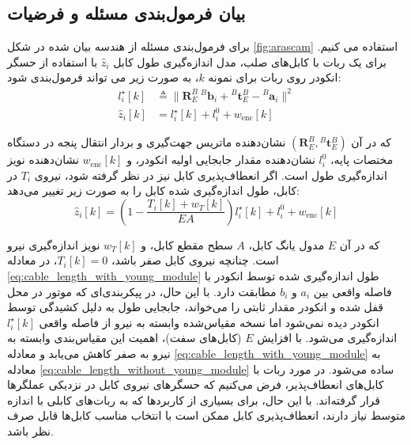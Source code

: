 \subsection{بیان فرمول‌بندی مسئله و فرضیات} \label{seq:formulation_rigid}
برای فرمول‌بندی مسئله از هندسه بیان شده در شکل 
\ref{fig:arascam}
استفاده می کنیم. برای یک ربات با کابل‌های صلب، مدل اندازه‌گیری طول کابل \( \hat{z}_i \) با استفاده از حسگر انکودر روی ربات برای نمونه $k$، به صورت زیر می تواند فرمول‌بندی ‌شود:
\begin{equation}\label{eq:cable_length_without_young_module}
	\begin{split}
		l^\star_i [k] &\triangleq \| \boldsymbol{R}^B_E ~ {}^B\!\boldsymbol{b}_i + {}^B\!\boldsymbol{t}_E^B - {}^B\!\boldsymbol{a}_i \|^2 \\
		\hat{z}_i [k] &= l^\star_i [k] + l_{i}^0 + w_{\text{enc}} [k]
	\end{split}
\end{equation}


که در آن
\( (\boldsymbol{R}^B_E, {}^B\!\boldsymbol{t}_E^B) \)
 نشان‌دهنده ماتریس جهت‌گیری و بردار انتقال پنجه در دستگاه مختصات پایه،
\(l_{i}^0  \)
نشان‌دهنده مقدار جابجایی اولیه انکودر، و 
\( w_{\text{enc}} [k] \)
 نشان‌دهنده نویز اندازه‌گیری طول است. اگر انعطاف‌پذیری کابل نیز در نظر گرفته شود، نیروی
\( T_i \)
 در کابل، طول اندازه‌گیری شده کابل را به صورت زیر تغییر می‌دهد:
\begin{equation} \label{eq:cable_length_with_young_module}
	\hat{z}_i [k] = \left(1 - \frac{T_i [k] + w_T [k]}{EA} \right) l^\star_i [k] + l_{i}^0 + w_{\text{enc}} [k]
\end{equation}


که در آن \( E \) مدول یانگ کابل، \( A \) سطح مقطع کابل، و \( w_T [k] \) نویز اندازه‌گیری نیرو است. چنانچه نیروی کابل صفر باشد،
\( T_i [k] = 0 \)، 
در معادله 
\ref{eq:cable_length_with_young_module}
 طول اندازه‌گیری شده توسط انکودر با فاصله واقعی بین \( a_i \) و \( b_i \) مطابقت دارد. با این حال، در پیکربندی‌ای که موتور در محل قفل شده و انکودر مقدار ثابتی را می‌خواند، جابجایی طول به دلیل کشیدگی توسط انکودر دیده نمی‌شود اما نسخه مقیاس‌شده وابسته به نیرو از فاصله واقعی \( l^\star_i [k] \) اندازه‌گیری می‌شود. با افزایش \( E \) (کابل‌های سفت)، اهمیت این مقیاس‌بندی وابسته به نیرو به صفر کاهش می‌یابد و معادله 
\ref{eq:cable_length_with_young_module}
به معادله
\ref{eq:cable_length_without_young_module}
 ساده می‌شود. در مورد ربات‌ با کابل‌های انعطاف‌پذیر، فرض می‌کنیم که حسگرهای نیروی کابل در نزدیکی عملگرها قرار گرفته‌اند. با این حال، برای بسیاری از کاربردها که به ربات‌های کابلی با اندازه متوسط نیاز دارند، انعطاف‌پذیری کابل ممکن است با انتخاب مناسب کابل‌ها قابل صرف نظر باشد.

